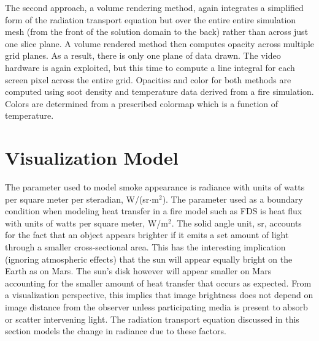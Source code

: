 The second approach, a volume rendering method, again integrates a
simplified form of the radiation transport equation but over the entire entire simulation mesh (from the
front of the solution domain to the back) rather than across just
one slice plane. A volume rendered method then computes opacity across multiple grid planes.
As a result, there is only one plane of data drawn.  The video hardware is again exploited, but this time to
compute a line integral for each screen pixel across the entire grid.  Opacities and
color for both methods are computed using soot density and
temperature data derived from a fire simulation. Colors are
determined from a prescribed colormap which is a function of
temperature.






%
%

\section{Visualization Model}
The parameter used to model smoke appearance is radiance with units of watts per square meter per steradian, W/(sr$\cdot$m$^2$).  The parameter used as a boundary condition when modeling heat transfer in a fire model such as FDS is heat flux with units of watts per square meter, W/m$^2$. The solid angle unit, sr, accounts for the fact that an object appears brighter if it emits a set amount of light through a smaller cross-sectional area. This has the interesting implication (ignoring atmospheric effects) that the sun will appear equally bright on the Earth as on Mars.  The sun's disk however will appear smaller on Mars accounting for the smaller amount of heat transfer that occurs as expected.  From a visualization perspective, this implies that image brightness does not depend on image distance from the observer unless  participating media is present to absorb or scatter  intervening light.  The radiation transport equation discussed in this section models the change in radiance due to these factors.


